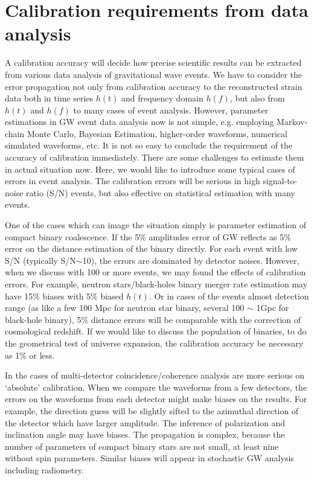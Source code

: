 
\section{Calibration requirements from data analysis}

A calibration accuracy will decide how precise scientific results can be extracted from various data 
analysis of gravitational wave events. We have to consider the error propagation not only from 
calibration accuracy to the reconstructed strain data both in time series $h(t)$ and frequency 
domain $h(f)$, but also from $h(t)$ and $h(f)$ to many cases of event analysis. However, parameter 
estimations in GW event data analysis now is not simple, e.g. employing Markov-chain Monte Carlo, 
Bayesian Estimation, higher-order waveforms, numerical simulated waveforms, etc. It is not so easy 
to conclude the requirement of the accuracy of calibration immediately. There are some challenges to 
estimate them in actual situation now. Here, we would like to introduce some typical cases of errors 
in event analysis. The calibration errors will be serious in high signal-to-noise ratio (S/N) 
events, but also effective on statistical estimation with many events.

One of the cases which can image the situation simply is parameter estimation of compact binary 
coalescence. If the 5\% amplitudes error of GW reflects as 5\% error on the distance estimation of 
the binary directly. For each event with low S/N (typically S/N$\sim$10), the errors are dominated by 
detector noises. However, when we discuss with 100 or more events, we may found the effects of 
calibration errors. For example, neutron stars/black-holes binary merger rate estimation may have 
15\% biases with 5\% biased $h(t)$. Or in cases of the events almost detection range (as like a few 
100 Mpc for neutron star binary, several 100 $\sim$ 1Gpc for black-hole binary), 5\% distance 
errors will be comparable with the correction of cosmological redshift. If we would like to discuss 
the population of binaries, to do the geometrical test of universe expansion, the calibration 
accuracy be necessary as 1\% or less.

In the cases of multi-detector coincidence/coherence analysis are more serious on `absolute' 
calibration. When we compare the waveforms from a few detectors, the errors on the waveforms from 
each detector might make biases on the results. For example, the direction guess will be slightly 
sifted to the azimuthal direction of the detector which have larger amplitude. The inference of 
polarization and inclination angle may have biases. The propagation is complex, because the number of
parameters of compact binary stars are not small, at least nine without spin parameters. Similar 
biases will appear in stochastic GW analysis including radiometry.

